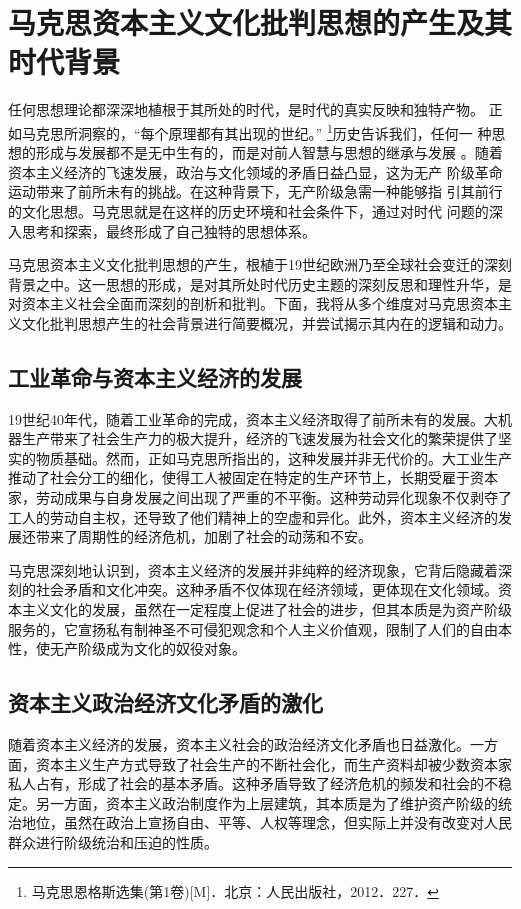 \newpage
\section{马克思资本主义文化批判思想的产生及其时代背景}
任何思想理论都深深地植根于其所处的时代，是时代的真实反映和独特产物。
正如马克思所洞察的，“每个原理都有其出现的世纪。”
\footnote{马克思恩格斯选集(第1卷)[M]．北京：人民出版社，2012．227．
}历史告诉我们，任何一
种思想的形成与发展都不是无中生有的，而是对前人智慧与思想的继承与发展
。随着资本主义经济的飞速发展，政治与文化领域的矛盾日益凸显，这为无产
阶级革命运动带来了前所未有的挑战。在这种背景下，无产阶级急需一种能够指
引其前行的文化思想。马克思就是在这样的历史环境和社会条件下，通过对时代
问题的深入思考和探索，最终形成了自己独特的思想体系。


马克思资本主义文化批判思想的产生，根植于19世纪欧洲乃至全球社会变迁的深刻背景之中。这一思想的形成，是对其所处时代历史主题的深刻反思和理性升华，是对资本主义社会全面而深刻的剖析和批判。下面，我将从多个维度对马克思资本主义文化批判思想产生的社会背景进行简要概况，并尝试揭示其内在的逻辑和动力。

\subsection{工业革命与资本主义经济的发展}

19世纪40年代，随着工业革命的完成，资本主义经济取得了前所未有的发展。大机器生产带来了社会生产力的极大提升，经济的飞速发展为社会文化的繁荣提供了坚实的物质基础。然而，正如马克思所指出的，这种发展并非无代价的。大工业生产推动了社会分工的细化，使得工人被固定在特定的生产环节上，长期受雇于资本家，劳动成果与自身发展之间出现了严重的不平衡。这种劳动异化现象不仅剥夺了工人的劳动自主权，还导致了他们精神上的空虚和异化。此外，资本主义经济的发展还带来了周期性的经济危机，加剧了社会的动荡和不安。

马克思深刻地认识到，资本主义经济的发展并非纯粹的经济现象，它背后隐藏着深刻的社会矛盾和文化冲突。这种矛盾不仅体现在经济领域，更体现在文化领域。资本主义文化的发展，虽然在一定程度上促进了社会的进步，但其本质是为资产阶级服务的，它宣扬私有制神圣不可侵犯观念和个人主义价值观，限制了人们的自由本性，使无产阶级成为文化的奴役对象。
\subsection{资本主义政治经济文化矛盾的激化}

随着资本主义经济的发展，资本主义社会的政治经济文化矛盾也日益激化。一方面，资本主义生产方式导致了社会生产的不断社会化，而生产资料却被少数资本家私人占有，形成了社会的基本矛盾。这种矛盾导致了经济危机的频发和社会的不稳定。另一方面，资本主义政治制度作为上层建筑，其本质是为了维护资产阶级的统治地位，虽然在政治上宣扬自由、平等、人权等理念，但实际上并没有改变对人民群众进行阶级统治和压迫的性质。

